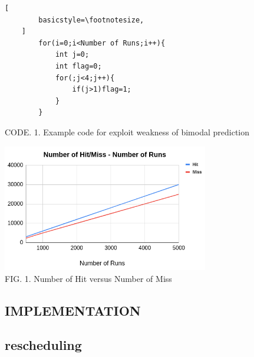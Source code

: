 \documentclass{article}
\begin{document}
\begin{CJK*}{UTF8}{bsmi}
\begin{multicols}{2}
\begin{center}
    \begin{lstlisting}[
        basicstyle=\footnotesize, 
    ]
        for(i=0;i<Number of Runs;i++){
            int j=0;
            int flag=0;
            for(;j<4;j++){
                if(j>1)flag=1;
            }
        }
    \end{lstlisting}
\end{center}

\begin{center}
    \footnotesize CODE. 1. Example code for exploit weakness of bimodal prediction
\end{center}

\begin{flushleft}
    \begin{center}
        \includegraphics[width=9cm]{hitmiss}\\
        \footnotesize FIG. 1. Number of Hit versus Number of Miss
    \end{center}
\end{flushleft}


\newpage

\begin{center}
    \section*{IMPLEMENTATION}    
    \subsection*{rescheduling}
\end{center}

\end{multicols}

\end{CJK*}
\end{document}
